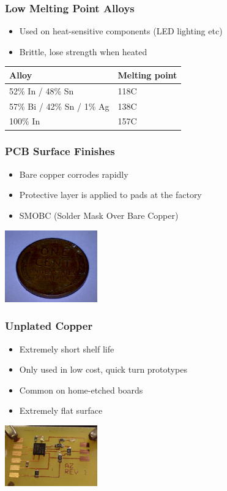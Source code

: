 \documentclass{beamer}
\begin{document}
\begin{frame}
\frametitle{Low Melting Point Alloys}
\begin{itemize}
\item Used on heat-sensitive components (LED lighting etc)
\item Brittle, lose strength when heated
\end{itemize}
\begin{tabularx}{\textwidth}{| X | X |}
\hline
\textbf{Alloy} & \textbf{Melting point}	\\ \hline
52\% In / 48\% Sn & 118C				\\ \hline
57\% Bi / 42\% Sn / 1\% Ag & 138C		\\ \hline
100\% In & 157C							\\ \hline
\end{tabularx}
\end{frame}

\begin{frame}
\frametitle{PCB Surface Finishes}
\begin{itemize}
\item Bare copper corrodes rapidly
\item Protective layer is applied to pads at the factory
\item SMOBC (Solder Mask Over Bare Copper)
\end{itemize}
\begin{center}
\includegraphics[width=4cm,keepaspectratio]{oxidized-copper.jpg}
\end{center}
\end{frame}

\begin{frame}
\frametitle{Unplated Copper}
\begin{itemize}
\item Extremely short shelf life
\item Only used in low cost, quick turn prototypes
\item Common on home-etched boards
\item Extremely flat surface
\end{itemize}
\begin{center}
\includegraphics[width=4cm,keepaspectratio]{no-plating.jpg}
\end{center}
\end{frame}
\end{document}
